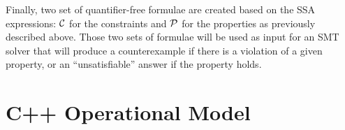 \documentclass[conference]{IEEEtran}
\begin{document}
Finally, two set of quantifier-free formulae are created based on the SSA expressions:
${\cal C}$ for the constraints and ${\cal P}$ for the properties as
previously described above. %
Those two sets of formulae will be used as input for an SMT solver
that will produce a counterexample
if there is a violation of a given property, or an ``unsatisfiable'' answer if the property holds.

\section{C++ Operational Model}
\label{cpp-operational-model}


\end{document}
